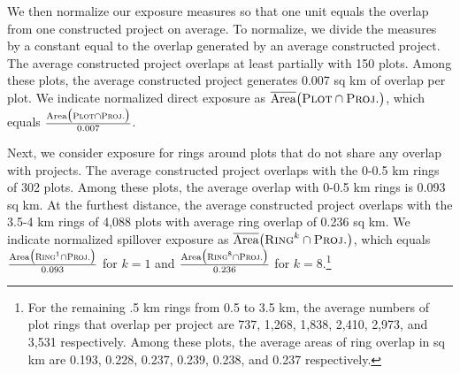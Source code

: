 \documentclass[12pt]{article}
\newcommand{\rv}{}
\begin{document}


\rv{We then normalize our exposure measures so that one unit equals the overlap from one constructed project on average.  To normalize, we divide the measures by a constant equal to the overlap generated by an average constructed project.  The average constructed project overlaps at least partially with 150 plots.  Among these plots, the average constructed project generates 0.007 sq km of overlap per plot.  We indicate normalized direct exposure as $\overline{\text{Area}}\big(\textsc{Plot}  \cap  \textsc{Proj.}\big)$, which equals $\frac{\text{Area}\big(\textsc{Plot}  \cap  \textsc{Proj.}\big)}{0.007}$.}

\rv{Next, we consider exposure for rings around plots that do not share any overlap with projects.  The average constructed project overlaps with the 0-0.5 km rings of 302 plots.  Among these plots, the average overlap with 0-0.5 km rings is 0.093 sq km.  At the furthest distance, the average constructed project overlaps with the 3.5-4 km rings of 4,088 plots with average ring overlap of 0.236 sq km.  We indicate normalized spillover exposure as $\overline{\text{Area}}\big(\textsc{Ring}^{k}  \cap  \textsc{Proj.}\big)$, which equals $\frac{\text{Area}\big(\textsc{Ring}^{1}  \cap  \textsc{Proj.}\big)}{0.093}$ for $k=1$ and $\frac{\text{Area}\big(\textsc{Ring}^{8}  \cap  \textsc{Proj.}\big)}{0.236}$ for $k=8$.\footnote{For the remaining .5 km rings from 0.5 to 3.5 km, the average numbers of plot rings that overlap per project are 737, 1,268, 1,838, 2,410, 2,973, and 3,531 respectively.  Among these plots, the average areas of ring overlap in sq km are 0.193, 0.228, 0.237, 0.239, 0.238, and 0.237 respectively.}}
\end{document}
